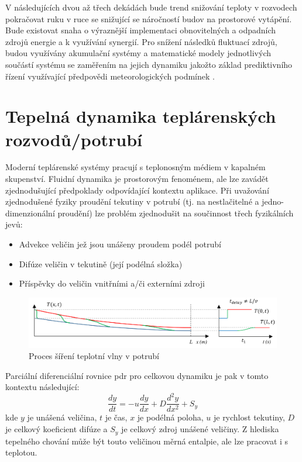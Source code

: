 V následujících dvou až třech dekádách bude trend snižování teploty v
rozvodech pokračovat ruku v ruce se snižující se náročností budov na prostorové
vytápění. Bude existovat snaha o výraznější implementaci obnovitelných a
odpadních zdrojů energie a k využívání synergií. Pro snížení následků fluktuací
zdrojů, budou využívány akumulační systémy a matematické modely jednotlivých
součástí systému se zaměřením na jejich dynamiku jakožto základ prediktivního
řízení využívající předpovědi meteorologických podmínek \cite{Lund2014}.

\section{Tepelná dynamika teplárenských rozvodů/potrubí}
\label{sec:HeatDynamics}
Moderní teplárenské systémy pracují s teplonosným médiem v kapalném skupenství.
Fluidní dynamika je prostorovým fenoménem, ale lze zavádět zjednodušující
předpoklady odpovídající kontextu aplikace. Při uvažování zjednodušené fyziky
proudění tekutiny v potrubí (tj. na nestlačitelné a jedno-dimenzionální
proudění) lze problém zjednodušit na součinnost třech fyzikálních jevů:

\begin{itemize}
  \item Advekce veličin jež jsou unášeny proudem podél potrubí
  \item Difúze veličin v tekutině (její podélná složka)
  \item Příspěvky do veličin vnitřními a/či externími zdroji
\end{itemize}

\begin{figure}[h] \capstart
  \label{fig:heatwave}
  \includegraphics[width=\textwidth]{figures/heat_front}
  \caption{Proces šíření teplotní vlny v potrubí}
\end{figure}
Parciální diferenciální rovnice \acrshort{pdr} pro celkovou dynamiku je pak v
tomto kontextu následující:
\begin{equation}
  \label{eq:AdvDiff}
  \frac{dy}{dt} = -u \frac{dy}{dx} + D\frac{d^{2}y}{dx^2} + {S_y}
\end{equation}
kde \(y\) je unášená veličina, \(t\) je čas, \(x\) je podélná poloha, \(u\) je
rychlost tekutiny, \(D\) je celkový koeficient difúze a \(S_y\) je celkový
zdroj unášené veličiny. Z hlediska tepelného chování může být touto veličinou
měrná entalpie, ale lze pracovat i s teplotou.

